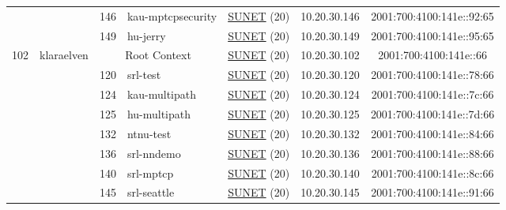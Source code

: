 \begin{small}
\begin{center}
\begin{longtable}{|c|c|c|c|c|c|c|c|}
  &  & \tiny{146} & \multicolumn{1}{|l|}{\tiny{kau-mptcpsecurity}} & \multicolumn{2}{|c|}{\tiny{\href{http://www.sunet.se}{SUNET} (20)}} & \tiny{10.20.30.146} & \tiny{2001:700:4100:141e::92:65} \\* \cline{3-3}\cline{4-4}\cline{5-5}\cline{6-6}\cline{7-7}\cline{8-8}
  &  & \tiny{149} & \multicolumn{1}{|l|}{\tiny{hu-jerry}} & \multicolumn{2}{|c|}{\tiny{\href{http://www.sunet.se}{SUNET} (20)}} & \tiny{10.20.30.149} & \tiny{2001:700:4100:141e::95:65} \\ \hline
 \multirow{8}{*}{\tiny{102}} & \multicolumn{1}{|l|}{\multirow{8}{*}{\tiny{klaraelven}}} & \multicolumn{2}{|c|}{\tiny{Root Context}} & \multicolumn{2}{|c|}{\tiny{\href{http://www.sunet.se}{SUNET} (20)}} & \tiny{10.20.30.102} & \tiny{2001:700:4100:141e::66} \\* \cline{3-3}\cline{4-4}\cline{5-5}\cline{6-6}\cline{7-7}\cline{8-8}
  &  & \tiny{120} & \multicolumn{1}{|l|}{\tiny{srl-test}} & \multicolumn{2}{|c|}{\tiny{\href{http://www.sunet.se}{SUNET} (20)}} & \tiny{10.20.30.120} & \tiny{2001:700:4100:141e::78:66} \\* \cline{3-3}\cline{4-4}\cline{5-5}\cline{6-6}\cline{7-7}\cline{8-8}
  &  & \tiny{124} & \multicolumn{1}{|l|}{\tiny{kau-multipath}} & \multicolumn{2}{|c|}{\tiny{\href{http://www.sunet.se}{SUNET} (20)}} & \tiny{10.20.30.124} & \tiny{2001:700:4100:141e::7c:66} \\* \cline{3-3}\cline{4-4}\cline{5-5}\cline{6-6}\cline{7-7}\cline{8-8}
  &  & \tiny{125} & \multicolumn{1}{|l|}{\tiny{hu-multipath}} & \multicolumn{2}{|c|}{\tiny{\href{http://www.sunet.se}{SUNET} (20)}} & \tiny{10.20.30.125} & \tiny{2001:700:4100:141e::7d:66} \\* \cline{3-3}\cline{4-4}\cline{5-5}\cline{6-6}\cline{7-7}\cline{8-8}
  &  & \tiny{132} & \multicolumn{1}{|l|}{\tiny{ntnu-test}} & \multicolumn{2}{|c|}{\tiny{\href{http://www.sunet.se}{SUNET} (20)}} & \tiny{10.20.30.132} & \tiny{2001:700:4100:141e::84:66} \\* \cline{3-3}\cline{4-4}\cline{5-5}\cline{6-6}\cline{7-7}\cline{8-8}
  &  & \tiny{136} & \multicolumn{1}{|l|}{\tiny{srl-nndemo}} & \multicolumn{2}{|c|}{\tiny{\href{http://www.sunet.se}{SUNET} (20)}} & \tiny{10.20.30.136} & \tiny{2001:700:4100:141e::88:66} \\* \cline{3-3}\cline{4-4}\cline{5-5}\cline{6-6}\cline{7-7}\cline{8-8}
  &  & \tiny{140} & \multicolumn{1}{|l|}{\tiny{srl-mptcp}} & \multicolumn{2}{|c|}{\tiny{\href{http://www.sunet.se}{SUNET} (20)}} & \tiny{10.20.30.140} & \tiny{2001:700:4100:141e::8c:66} \\* \cline{3-3}\cline{4-4}\cline{5-5}\cline{6-6}\cline{7-7}\cline{8-8}
  &  & \tiny{145} & \multicolumn{1}{|l|}{\tiny{srl-seattle}} & \multicolumn{2}{|c|}{\tiny{\href{http://www.sunet.se}{SUNET} (20)}} & \tiny{10.20.30.145} & \tiny{2001:700:4100:141e::91:66} \\ \hline
\end{longtable}
\end{center}
\end{small}



